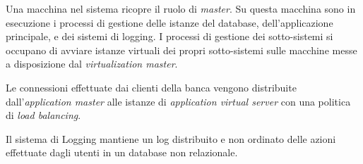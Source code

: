 Una macchina nel sistema ricopre il ruolo di \emph{master}.
Su questa macchina sono in esecuzione i processi di gestione delle istanze del database, dell'applicazione principale, e dei sistemi di logging.
I processi di gestione dei sotto-sistemi si occupano di avviare istanze virtuali dei propri sotto-sistemi sulle macchine messe a disposizione dal \emph{virtualization master}.

Le connessioni effettuate dai clienti della banca vengono distribuite dall'\emph{application master} alle istanze di \emph{application virtual server} con una politica di \emph{load balancing}.

Il sistema di Logging mantiene un log distribuito e non ordinato delle azioni effettuate dagli utenti in un database non relazionale.


